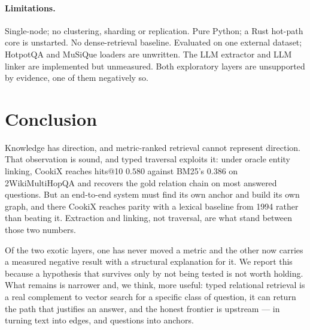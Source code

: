 \documentclass[11pt]{article}
\theoremstyle{definition}
\begin{document}
\paragraph{Limitations.} Single-node; no clustering, sharding or replication. Pure
Python; a Rust hot-path core is unstarted. No dense-retrieval baseline. Evaluated on one
external dataset; HotpotQA and MuSiQue loaders are unwritten. The LLM extractor and LLM
linker are implemented but unmeasured. Both exploratory layers are unsupported by
evidence, one of them negatively so.

\section{Conclusion}

Knowledge has direction, and metric-ranked retrieval cannot represent direction. That
observation is sound, and typed traversal exploits it: under oracle entity linking,
CookiX reaches hits@10 $0.580$ against BM25's $0.386$ on 2WikiMultiHopQA and recovers the
gold relation chain on most answered questions. But an end-to-end system must find its
own anchor and build its own graph, and there CookiX reaches parity with a lexical
baseline from 1994 rather than beating it. Extraction and linking, not traversal, are
what stand between those two numbers.

Of the two exotic layers, one has never moved a metric and the other now carries a
measured negative result with a structural explanation for it. We report this because a
hypothesis that survives only by not being tested is not worth holding. What remains is
narrower and, we think, more useful: typed relational retrieval is a real complement to
vector search for a specific class of question, it can return the path that justifies an
answer, and the honest frontier is upstream --- in turning text into edges, and questions
into anchors.
\end{document}
